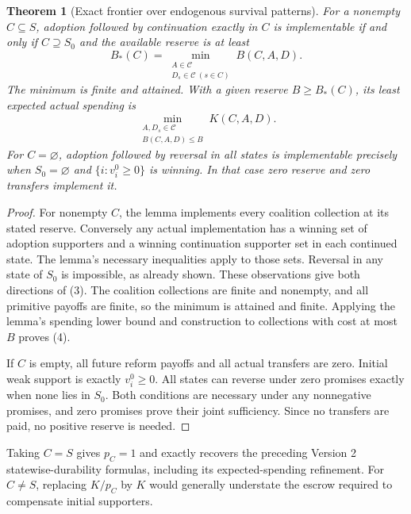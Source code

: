\documentclass[11pt]{article}
\newtheorem{theorem}{Theorem}
\theoremstyle{definition}
\begin{document}
\begin{theorem}[Exact frontier over endogenous survival patterns]
For a nonempty $C\subseteq S$, adoption followed by continuation
exactly in $C$ is implementable if and only if $C\supseteq S_0$ and
the available reserve is at least
\[
 B_*(C)=\min_{\substack{A\in\mathcal C\\
                            D_s\in\mathcal C\ (s\in C)}} B(C,A,D).
                                                               \tag{3}
\]
The minimum is finite and attained. With a given reserve
$B\geq B_*(C)$, its least expected actual spending is
\[
 \min_{\substack{A,D_s\in\mathcal C\\B(C,A,D)\leq B}}
       K(C,A,D).                                             \tag{4}
\]
For $C=\varnothing$, adoption followed by reversal in all states is
implementable precisely when $S_0=\varnothing$ and
$\{i:v_i^0\geq0\}$ is winning. In that case zero reserve and zero
transfers implement it.
\end{theorem}
\begin{proof}
For nonempty $C$, the lemma implements every coalition collection at
its stated reserve. Conversely any actual implementation has a winning
set of adoption supporters and a winning continuation supporter set
in each continued state. The lemma's necessary inequalities apply to
those sets. Reversal in any state of $S_0$ is impossible, as already
shown. These observations give both directions of (3). The coalition
collections are finite and nonempty, and all primitive payoffs are
finite, so the minimum is attained and finite. Applying the lemma's
spending lower bound and construction to collections with cost at most
$B$ proves (4).

If $C$ is empty, all future reform payoffs and all actual transfers
are zero. Initial weak support is exactly $v_i^0\geq0$. All states
can reverse under zero promises exactly when none lies in $S_0$.
Both conditions are necessary under any nonnegative promises, and
zero promises prove their joint sufficiency. Since no transfers are
paid, no positive reserve is needed.
\end{proof}

Taking $C=S$ gives $p_C=1$ and exactly recovers the preceding
Version 2 statewise-durability formulas, including its expected-spending
refinement. For $C\ne S$, replacing $K/p_C$ by $K$ would generally
understate the escrow required to compensate initial supporters.
\end{document}
